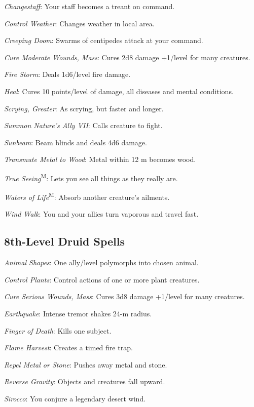 \textit{Changestaff}: Your staff becomes a treant on command.

\textit{Control Weather}: Changes weather in local area.

\textit{Creeping Doom}: Swarms of centipedes attack at your command.

\textit{Cure Moderate Wounds, Mass}: Cures 2d8 damage +1/level for many creatures.

\textit{Fire Storm}: Deals 1d6/level fire damage.

\textit{Heal}: Cures 10 points/level of damage, all diseases and mental conditions.

\textit{Scrying, Greater}: As scrying, but faster and longer.

\textit{Summon Nature's Ally VII}: Calls creature to fight.

\textit{Sunbeam}: Beam blinds and deals 4d6 damage.

\textit{Transmute Metal to Wood}: Metal within 12 m becomes wood.

\textit{True Seeing}\textsuperscript{M}: Lets you see all things as they really are.

\textit{Waters of Life}\textsuperscript{M}: Absorb another creature’s ailments.

\textit{Wind Walk}: You and your allies turn vaporous and travel fast.



\subsection{8th-Level Druid Spells}

\textit{Animal Shapes}: One ally/level polymorphs into chosen animal.

\textit{Control Plants}: Control actions of one or more plant creatures.

\textit{Cure Serious Wounds, Mass}: Cures 3d8 damage +1/level for many creatures.

\textit{Earthquake}: Intense tremor shakes 24-m radius.

\textit{Finger of Death}: Kills one subject.

\textit{Flame Harvest}: Creates a timed fire trap.

\textit{Repel Metal or Stone}: Pushes away metal and stone.

\textit{Reverse Gravity}: Objects and creatures fall upward.

\textit{Sirocco}: You conjure a legendary desert wind.

